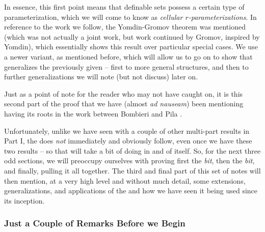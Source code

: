 In essence, this first point means that definable sets possess a certain type of parameterization, which we will come to know as \emph{cellular $r$-parameterizations}. In reference to the work we follow, the Yomdin-Gromov theorem was mentioned (which was not actually a joint work, but work continued by Gromov, inspired by Yomdin), which essentially shows this result over particular special cases. We use a newer variant, as mentioned before, which will allow us to go on to show that \pw generalizes the previously given -- first to more general \om structures, and then to further generalizations we will note (but not discuss) later on.

\begin{svgraybox}
  Just as a point of note for the reader who may not have caught on, it is this second part of the proof that we have (almost \textit{ad nauseam}) been mentioning having its roots in the work between Bombieri and Pila \cite{bombieri_number_1989}.
\end{svgraybox}

Unfortunately, unlike we have seen with a couple of other multi-part results in Part I, the \pwt does \emph{not} immediately and obviously follow, even once we have these two results -- so that will take a bit of doing in and of itself. So, for the next three odd sections, we will preoccupy ourselves with proving first the \emph{\om bit}, then the \emph{\nt bit}, and finally, pulling it all together. The third and final part of this set of notes will then mention, at a very high level and without much detail, some extensions, generalizations, and applications of the \pwt and how we have seen it being used since its inception.

\subsubsection{Just a Couple of Remarks Before we Begin}

